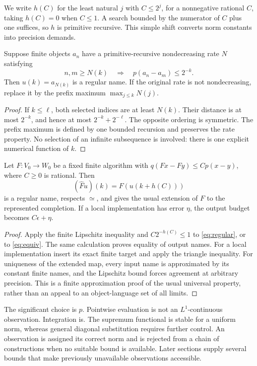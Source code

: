 We write \(h(C)\) for the least natural \(j\) with
\(C\leq2^j\), for a nonnegative rational \(C\), taking \(h(C)=0\)
when \(C\leq1\). A search bounded by the numerator of \(C\) plus one
suffices, so \(h\) is primitive recursive. This simple shift converts
norm constants into precision demands.

\begin{lemma}
Suppose finite objects \(a_n\) have a primitive-recursive nondecreasing
rate \(N\) satisfying
\[
 n,m\geq N(k)\quad\Longrightarrow\quad p(a_n-a_m)\leq2^{-k}.
\]
Then \(u(k)=a_{N(k)}\) is a regular name. If the original rate is not
nondecreasing, replace it by the prefix maximum
\(\max_{j\leq k}N(j)\).
\end{lemma}
\begin{proof}
If \(k\leq\ell\), both selected indices are at least \(N(k)\).
Their distance is at most \(2^{-k}\), and hence at most
\(2^{-k}+2^{-\ell}\). The opposite ordering is symmetric. The prefix
maximum is defined by one bounded recursion and preserves the rate
property. No selection of an infinite subsequence is involved: there is
one explicit numerical function of \(k\).
\end{proof}

\begin{lemma}\label{lem:stable-lift}
Let \(F:V_0\to W_0\) be a fixed finite algorithm with
\(q(Fx-Fy)\leq C p(x-y)\), where \(C\geq0\) is rational.
Then
\[
 (\widehat F u)(k)=F(u(k+h(C)))
\]
is a regular name, respects \(\simeq\), and gives the usual extension
of \(F\) to the represented completion. If a local implementation has
error \(\eta\), the output budget becomes \(C\epsilon+\eta\).
\end{lemma}
\begin{proof}
Apply the finite Lipschitz inequality and
\(C2^{-h(C)}\leq1\) to \eqref{eq:regular}, or to
\eqref{eq:equiv}. The same calculation proves equality of output names.
For a local implementation insert its exact finite target and apply the
triangle inequality. For uniqueness of the extended map, every input
name is approximated by its constant finite names, and the Lipschitz
bound forces agreement at arbitrary precision. This is a finite
approximation proof of the usual universal property, rather than an
appeal to an object-language set of all limits.
\end{proof}

The significant choice is \(p\). Pointwise evaluation is not an
\(L^1\)-continuous observation. Integration is. The supremum functional
is stable for a uniform norm, whereas general diagonal substitution
requires further control. An observation is assigned its correct norm
and is rejected from a chain of constructions when no suitable bound is
available. Later sections supply several bounds that make previously
unavailable observations accessible.


